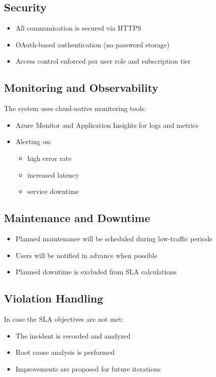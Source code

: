 \documentclass[11pt]{article}
\begin{document}
\subsection{Security}
\begin{itemize}[leftmargin=*]
  \item All communication is secured via HTTPS
  \item OAuth-based authentication (no password storage)
  \item Access control enforced per user role and subscription tier
\end{itemize}

\subsection{Monitoring and Observability}
The system uses cloud-native monitoring tools:
\begin{itemize}[leftmargin=*]
  \item Azure Monitor and Application Insights for logs and metrics
  \item Alerting on:
  \begin{itemize}
    \item high error rate
    \item increased latency
    \item service downtime
  \end{itemize}
\end{itemize}

\subsection{Maintenance and Downtime}
\begin{itemize}[leftmargin=*]
  \item Planned maintenance will be scheduled during low-traffic periods
  \item Users will be notified in advance when possible
  \item Planned downtime is excluded from SLA calculations
\end{itemize}


\subsection{Violation Handling}
In case the SLA objectives are not met:
\begin{itemize}[leftmargin=*]
  \item The incident is recorded and analyzed
  \item Root cause analysis is performed
  \item Improvements are proposed for future iterations
\end{itemize}
\end{document}
